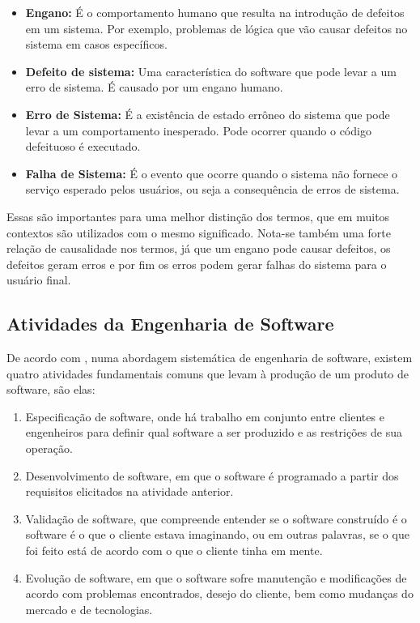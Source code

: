 \begin{itemize}
    \item \textbf{Engano:} É o comportamento humano que resulta na introdução de defeitos em um sistema. Por exemplo, problemas de lógica que vão causar defeitos no sistema em casos específicos.

    \item \textbf{Defeito de sistema:} Uma característica do software que pode levar a um erro de sistema. É causado por um engano humano.
    
    \item \textbf{Erro de Sistema:} É a existência de estado errôneo do sistema que pode levar a um comportamento inesperado. Pode ocorrer quando o código defeituoso é executado.

    \item \textbf{Falha de Sistema:} É o evento que ocorre quando o sistema não fornece o serviço esperado pelos usuários, ou seja a consequência de erros de sistema.
\end{itemize}

Essas são importantes para uma melhor distinção dos termos, que em muitos contextos são utilizados com o mesmo significado. Nota-se também uma forte relação de causalidade nos termos, já que um engano pode causar defeitos, os defeitos geram erros e por fim os erros podem gerar falhas do sistema para o usuário final.

\subsection{Atividades da Engenharia de Software}
De acordo com \citeauthor{Sommerville2007}, numa abordagem sistemática de engenharia de software, existem quatro atividades fundamentais comuns que levam à produção de um produto de software, são elas:

\begin{enumerate}
    \item Especificação de software, onde há trabalho em conjunto entre clientes e engenheiros para definir qual software a ser produzido e as restrições de sua operação.
    \item Desenvolvimento de software, em que o software é programado a partir dos requisitos elicitados na atividade anterior.
    \item Validação de software, que compreende entender se o software construído é o software é o que o cliente estava imaginando, ou em outras palavras, se o que foi feito está de acordo com o que o cliente tinha em mente.
    \item Evolução de software, em que o software sofre manutenção e modificações de acordo com problemas encontrados, desejo do cliente, bem como mudanças do mercado e de tecnologias.
\end{enumerate}

